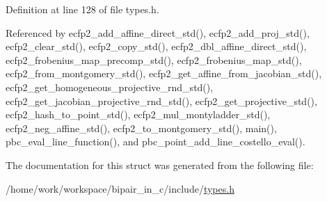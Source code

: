 Definition at line 128 of file types.\-h.



Referenced by ecfp2\-\_\-add\-\_\-affine\-\_\-direct\-\_\-std(), ecfp2\-\_\-add\-\_\-proj\-\_\-std(), ecfp2\-\_\-clear\-\_\-std(), ecfp2\-\_\-copy\-\_\-std(), ecfp2\-\_\-dbl\-\_\-affine\-\_\-direct\-\_\-std(), ecfp2\-\_\-frobenius\-\_\-map\-\_\-precomp\-\_\-std(), ecfp2\-\_\-frobenius\-\_\-map\-\_\-std(), ecfp2\-\_\-from\-\_\-montgomery\-\_\-std(), ecfp2\-\_\-get\-\_\-affine\-\_\-from\-\_\-jacobian\-\_\-std(), ecfp2\-\_\-get\-\_\-homogeneous\-\_\-projective\-\_\-rnd\-\_\-std(), ecfp2\-\_\-get\-\_\-jacobian\-\_\-projective\-\_\-rnd\-\_\-std(), ecfp2\-\_\-get\-\_\-projective\-\_\-std(), ecfp2\-\_\-hash\-\_\-to\-\_\-point\-\_\-std(), ecfp2\-\_\-mul\-\_\-montyladder\-\_\-std(), ecfp2\-\_\-neg\-\_\-affine\-\_\-std(), ecfp2\-\_\-to\-\_\-montgomery\-\_\-std(), main(), pbc\-\_\-eval\-\_\-line\-\_\-function(), and pbc\-\_\-point\-\_\-add\-\_\-line\-\_\-costello\-\_\-eval().



The documentation for this struct was generated from the following file\-:\begin{DoxyCompactItemize}
\item 
/home/work/workspace/bipair\-\_\-in\-\_\-c/include/\hyperlink{types_8h}{types.\-h}\end{DoxyCompactItemize}
